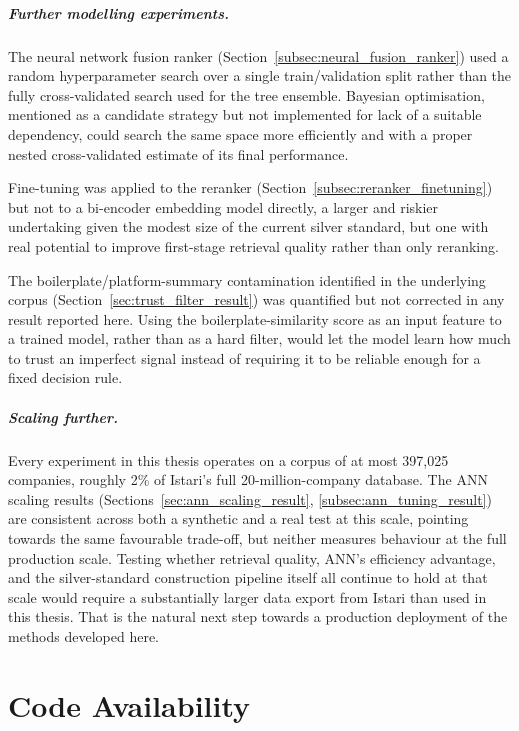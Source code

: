 \documentclass[a4paper,oneside,bibliography=totoc]{scrbook}
\begin{document}
\paragraph{Further modelling experiments.} The neural network fusion ranker (Section~\ref{subsec:neural_fusion_ranker}) used a random hyperparameter search over a single train/validation split rather than the fully cross-validated search used for the tree ensemble. Bayesian optimisation, mentioned as a candidate strategy but not implemented for lack of a suitable dependency, could search the same space more efficiently and with a proper nested cross-validated estimate of its final performance.

Fine-tuning was applied to the reranker (Section~\ref{subsec:reranker_finetuning}) but not to a bi-encoder embedding model directly, a larger and riskier undertaking given the modest size of the current silver standard, but one with real potential to improve first-stage retrieval quality rather than only reranking.

The boilerplate/platform-summary contamination identified in the underlying corpus (Section~\ref{sec:trust_filter_result}) was quantified but not corrected in any result reported here. Using the boilerplate-similarity score as an input feature to a trained model, rather than as a hard filter, would let the model learn how much to trust an imperfect signal instead of requiring it to be reliable enough for a fixed decision rule.

\paragraph{Scaling further.} Every experiment in this thesis operates on a corpus of at most 397,025 companies, roughly 2\% of Istari's full 20-million-company database. The ANN scaling results (Sections~\ref{sec:ann_scaling_result}, \ref{subsec:ann_tuning_result}) are consistent across both a synthetic and a real test at this scale, pointing towards the same favourable trade-off, but neither measures behaviour at the full production scale. Testing whether retrieval quality, ANN's efficiency advantage, and the silver-standard construction pipeline itself all continue to hold at that scale would require a substantially larger data export from Istari than used in this thesis. That is the natural next step towards a production deployment of the methods developed here.




\backmatter
\chapter{Code Availability}
\end{document}
